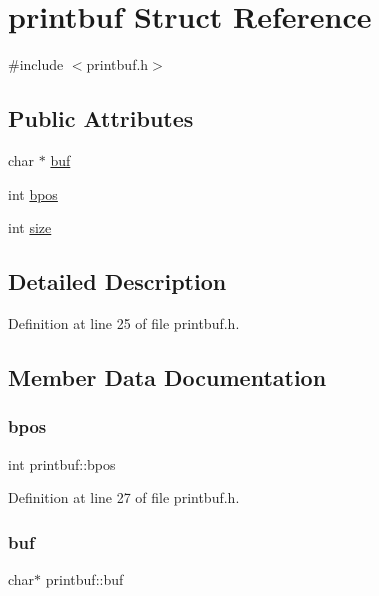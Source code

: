\hypertarget{structprintbuf}{}\section{printbuf Struct Reference}
\label{structprintbuf}


{\ttfamily \#include $<$printbuf.\+h$>$}

\subsection*{Public Attributes}
\begin{DoxyCompactItemize}
\item 
char $\ast$ \hyperlink{structprintbuf_a5d7cf8ac260f1f7c50fecaf9bd7bc651}{buf}
\item 
int \hyperlink{structprintbuf_aba980ad7406329e32f557dfa0eb7b1b2}{bpos}
\item 
int \hyperlink{structprintbuf_a12ce6440eaa06a55b96ebdc5a9778dd5}{size}
\end{DoxyCompactItemize}


\subsection{Detailed Description}


Definition at line 25 of file printbuf.\+h.



\subsection{Member Data Documentation}
\mbox{\label{structprintbuf_aba980ad7406329e32f557dfa0eb7b1b2}} 
\subsubsection{\texorpdfstring{bpos}{bpos}}
{\footnotesize\ttfamily int printbuf\+::bpos}



Definition at line 27 of file printbuf.\+h.

\mbox{\label{structprintbuf_a5d7cf8ac260f1f7c50fecaf9bd7bc651}} 
\subsubsection{\texorpdfstring{buf}{buf}}
{\footnotesize\ttfamily char$\ast$ printbuf\+::buf}




